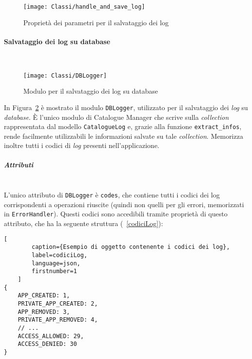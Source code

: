 \begin{itemize}
\begin{figure}[hbpc]
  \begin{center}
    \texttt{[image: Classi/handle\_and\_save\_log]}
  \caption[Proprietà dei parametri per il salvataggio dei log]{Proprietà dei parametri per il salvataggio dei log}
  \label{fig:handle_and_save_log}
  \end{center} 
\end{figure}
\end{itemize}

\newpage
\paragraph{Salvataggio dei log su database} \mbox{} \\
\begin{figure}[hbpc]
  \begin{center}
    \texttt{[image: Classi/DBLogger]}
  \caption[Modulo per il salvataggio dei log su database]{Modulo per il salvataggio dei log su database}
  \label{fig:DBLogger}
  \end{center} 
\end{figure}
In Figura~\ref{fig:DBLogger} è mostrato il modulo \texttt{DBLogger}, utilizzato per il salvataggio dei \textit{log} su \textit{database}. È l'unico modulo di Catalogue Manager che scrive sulla \textit{collection} rappresentata dal modello \texttt{CatalogueLog} e, grazie alla funzione \texttt{extract\_infos}, rende facilmente utilizzabili le informazioni salvate su tale \textit{collection}. Memorizza inoltre tutti i codici di \textit{log} presenti nell'applicazione.

\subparagraph{Attributi} \mbox{} \\
L'unico attributo di \texttt{DBLogger} è \texttt{codes}, che contiene tutti i codici dei log corrispondenti a operazioni riuscite (quindi non quelli per gli errori, memorizzati in \texttt{ErrorHandler}). Questi codici sono accedibili tramite proprietà di questo attributo, che ha la seguente struttura (\lstlistingname~\ref{codiciLog}):
\begin{lstlisting}[
		caption={Esempio di oggetto contenente i codici dei log},
		label=codiciLog,
		language=json,
		firstnumber=1
	]
{
	APP_CREATED: 1,
	PRIVATE_APP_CREATED: 2,
	APP_REMOVED: 3,
	PRIVATE_APP_REMOVED: 4,
	// ...
	ACCESS_ALLOWED: 29,
	ACCESS_DENIED: 30
}
\end{lstlisting}

